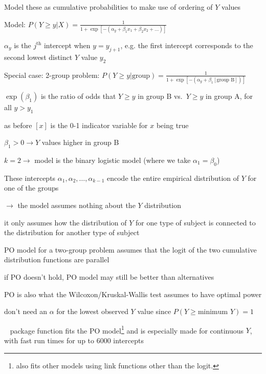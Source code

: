 \item Model these as cumulative probabilities to make use of ordering of $Y$ values
\item Model: $P(Y \geq y | X) = \frac{1}{1 + \exp[-(\alpha_y + \beta_1 x_1 + \beta_2 x_2 + \dots)]}$
\item $\alpha_y$ is the $j^{\textrm{th}}$ intercept when $y = y_{j+1}$, e.g. the first intercept corresponds to the second lowest distinct $Y$ value $y_2$
\item Special case: 2-group problem: $P(Y \geq y | \textrm{group}) = \frac{1}{1 + \exp[-(\alpha_y + \beta_1[\textrm{group B}])]}$
 \bi
 \item $\exp(\beta_1)$ is the ratio of odds that $Y \geq y$ in group B vs.\ $Y \geq y$ in group A, for all $y > y_1$ 
 \item as before $[x]$ is the 0-1 indicator variable for $x$ being true
 \item $\beta_1 > 0 \rightarrow Y$ values higher in group B
 \item $k=2 \rightarrow$ model is the binary logistic model (where we take $\alpha_1 = \beta_0$)
 \ei
\item These intercepts $\alpha_1, \alpha_2, \dots, \alpha_{k-1}$ encode the entire empirical distribution of $Y$ for one of the groups
 \bi
 \item $\rightarrow$ the model assumes nothing about the $Y$ distribution
 \item it only assumes how the distribution of $Y$ for one type of subject is connected to the distribution for another type of subject
 \item PO model for a two-group problem assumes that the logit of the two cumulative distribution functions are parallel
 \item if PO doesn't hold, PO model may still be better than alternatives
 \item PO is also what the Wilcoxon/Kruskal-Wallis test assumes to have optimal power
 \item don't need an $\alpha$ for the lowest observed $Y$ value since $P(Y \geq \textrm{minimum } Y) = 1$
 \ei
\item \R\  package  function fits the PO model\footnote{ also fits other models using link functions other than the logit.} and is especially made for continuous $Y$, with fast run times for up to 6000 intercepts
\ei

